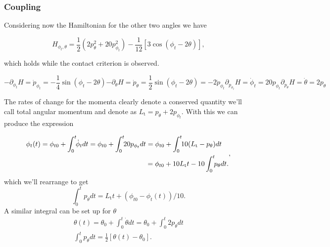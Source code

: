 \documentclass[prbg,preprint]{revtex4-1}
\begin{document}
\subsubsection{Coupling}

Considering now the Hamiltonian for the other two angles we have

\begin{equation}
	H_{\phi_t, \theta}=
	\frac{1}{2}\left (
	2 p_\theta^2
	+20 p_{\phi_t}^2 
        \right )
	-
	\frac{1}{12}
	[
	        3\cos(\phi_t-2\theta)
	    ],
\end{equation}

which holds while the contact criterion is observed.

\begin{subequations}
	\begin{equation}\label{f_phit}
		-\partial_{\phi_t}H= \dot p_{\phi_t} 
		= - \frac{1}{4} \sin{\left (\phi_{t} - 2 \theta \right )}
	\end{equation}
	\begin{equation}\label{f_tht}
		-\partial_{\theta}H= \dot p_{\theta}  
		= \frac{1}{2} \sin{\left (\phi_{t} - 2 \theta \right )}
		=-2\dot p_{\phi_t}
	\end{equation}
	\begin{equation}
		\partial_{p_{\phi_t}}H= \dot \phi_t 
		= 20 p_{\phi_t}
	\end{equation}
	\begin{equation}
		\partial_{p_{\theta}}H= \dot \theta 
		= 2 p_{\theta}
	\end{equation}
\end{subequations}

The rates of change for the momenta clearly denote a conserved quantity we'll call total angular momentum and denote as 
$L_\textrm{t} = p_\theta + 2p_{\phi_t}$. 
With this we can produce the expression

\begin{equation}
  \begin{multlined}
	\phi_t(t) 
	= \phi_{t0} + \int_0^t \kern-.33em  \dot \phi_t  dt
	= \phi_{t0} + \int_0^t \kern-.33em 20 p_{ \phi_t } dt
	= \phi_{t0} + \int_0^t \kern-.33em 10 (L_\textrm{t}-p_{ \theta }) dt
	\\
	= \phi_{t0} + 10L_\textrm{t} t -10 \int_0^t \kern-.33em p_{ \theta } dt.
  \end{multlined},
\end{equation}
which we'll rearrange to get
\begin{equation}\label{phi_int}
	\int_0^t  p_{ \theta } dt
	= L_\textrm{t} t + (\phi_{t0}  - \phi_t(t))/10.
\end{equation}
A similar integral can be set up for $\theta$
\begin{equation}\label{tht_int}
  \begin{multlined}
	\theta(t) 
	= \theta_{ 0} + \int_0^t  \dot \theta  dt
	= \theta_{ 0} + \int_0^t  2 p_{\theta} dt
	\\
	\int_0^t  p_{\theta} dt = \frac{1}{2}[\theta(t)-\theta_{0}].
  \end{multlined}
\end{equation}
\end{document}
